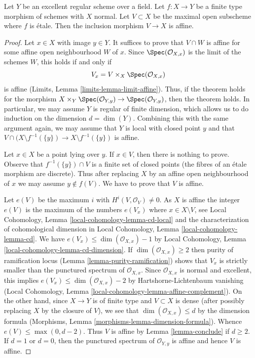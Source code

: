\begin{theorem}
\label{theorem-global}
Let $Y$ be an excellent regular scheme over a field. Let $f : X \to Y$
be a finite type morphism of schemes with $X$ normal. Let $V \subset X$
be the maximal open subscheme where $f$ is \'etale. Then the inclusion
morphism $V \to X$ is affine.
\end{theorem}

\begin{proof}
Let $x \in X$ with image $y \in Y$. It suffices to prove that
$V \cap W$ is affine for some affine open neighbourhood $W$ of $x$.
Since $\Spec(\mathcal{O}_{X, x})$ is the limit of the schemes $W$,
this holds if and only if
$$
V_x = V \times_X \Spec(\mathcal{O}_{X, x})
$$
is affine (Limits, Lemma \ref{limits-lemma-limit-affine}).
Thus, if the theorem holds for the morphism
$X \times_Y \Spec(\mathcal{O}_{Y, y}) \to \Spec(\mathcal{O}_{Y, y})$,
then the theorem holds. In particular, we may assume $Y$
is regular of finite dimension, which allows us to do induction
on the dimension $d = \dim(Y)$. Combining this with the same argument again,
we may assume that $Y$ is local with closed point $y$ and that
$V \cap (X \setminus f^{-1}(\{y\}) \to X \setminus f^{-1}(\{y\})$
is affine.

\medskip\noindent
Let $x \in X$ be a point lying over $y$. If $x \in V$, then
there is nothing to prove. Observe that  $f^{-1}(\{y\}) \cap V$
is a finite set of closed points (the fibres of an \'etale morphism
are discrete). Thus after replacing $X$
by an affine open neighbourhood of $x$ we may assume
$y \not \in f(V)$. We have to prove that $V$ is affine.

\medskip\noindent
Let $e(V)$ be the maximum $i$ with $H^i(V, \mathcal{O}_V) \not = 0$.
As $X$ is affine the integer $e(V)$ is the maximum of the numbers $e(V_x)$
where $x \in X \setminus V$, see
Local Cohomology, Lemma \ref{local-cohomology-lemma-cd-local}
and the characterization of cohomological dimension
in Local Cohomology, Lemma \ref{local-cohomology-lemma-cd}.
We have $e(V_x) \leq \dim(\mathcal{O}_{X, x}) - 1$ by
Local Cohomology, Lemma \ref{local-cohomology-lemma-cd-dimension}.
If $\dim(\mathcal{O}_{X, x}) \geq 2$ then purity of
ramification locus (Lemma \ref{lemma-purity-ramification})
shows that $V_x$ is strictly smaller than the punctured spectrum of
$\mathcal{O}_{X, x}$. Since $\mathcal{O}_{X, x}$ is
normal and excellent, this implies
$e(V_x) \leq \dim(\mathcal{O}_{X, x}) - 2$ by
Hartshorne-Lichtenbaum vanishing
(Local Cohomology, Lemma \ref{local-cohomology-lemma-affine-complement}).
On the other hand, since $X \to Y$ is of finite type
and $V \subset X$ is dense (after possibly replacing $X$
by the closure of $V$), we see that $\dim(\mathcal{O}_{X, x}) \leq d$
by the dimension formula
(Morphisms, Lemma \ref{morphisms-lemma-dimension-formula}).
Whence $e(V) \leq \max(0, d -  2)$.
Thus $V$ is affine by Lemma \ref{lemma-conclude}
if $d \geq 2$. If $d = 1$ or $d = 0$, then the punctured spectrum of
$\mathcal{O}_{Y, y}$ is affine and hence $V$ is affine.
\end{proof}